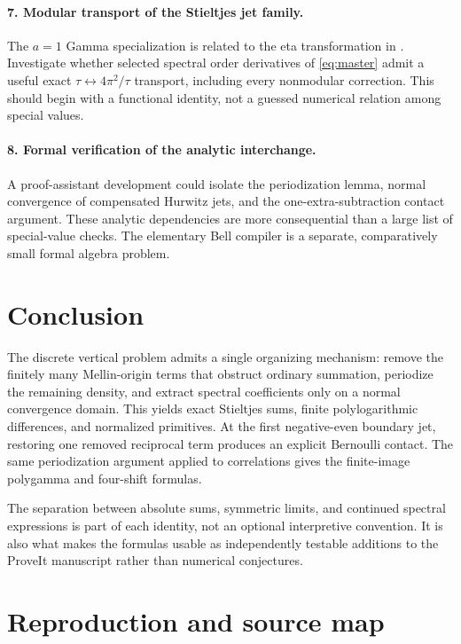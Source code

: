 \documentclass[11pt,a4paper]{article}
\numberwithin{equation}{section}
\theoremstyle{definition}
\theoremstyle{remark}
\begin{document}
\paragraph{7. Modular transport of the Stieltjes jet family.}
The $a=1$ Gamma specialization is related to the eta transformation
in \cite{ArdehaliRosengren}. Investigate whether selected spectral
order derivatives of \eqref{eq:master} admit a useful exact
$\tau\leftrightarrow4\pi^2/\tau$ transport, including every
nonmodular correction. This should begin with a functional identity,
not a guessed numerical relation among special values.

\paragraph{8. Formal verification of the analytic interchange.}
A proof-assistant development could isolate the periodization lemma,
normal convergence of compensated Hurwitz jets, and the
one-extra-subtraction contact argument. These analytic dependencies
are more consequential than a large list of special-value checks.
The elementary Bell compiler is a separate, comparatively small
formal algebra problem.

\section{Conclusion}

The discrete vertical problem admits a single organizing mechanism:
remove the finitely many Mellin-origin terms that obstruct ordinary
summation, periodize the remaining density, and extract spectral
coefficients only on a normal convergence domain. This yields exact
Stieltjes sums, finite polylogarithmic differences, and normalized
primitives. At the first negative-even boundary jet, restoring one
removed reciprocal term produces an explicit Bernoulli contact.
The same periodization argument applied to correlations gives the
finite-image polygamma and four-shift formulas.

The separation between absolute sums, symmetric limits, and
continued spectral expressions is part of each identity, not an
optional interpretive convention. It is also what makes the
formulas usable as independently testable additions to the ProveIt
manuscript rather than numerical conjectures.

\appendix
\section{Reproduction and source map}
\end{document}
